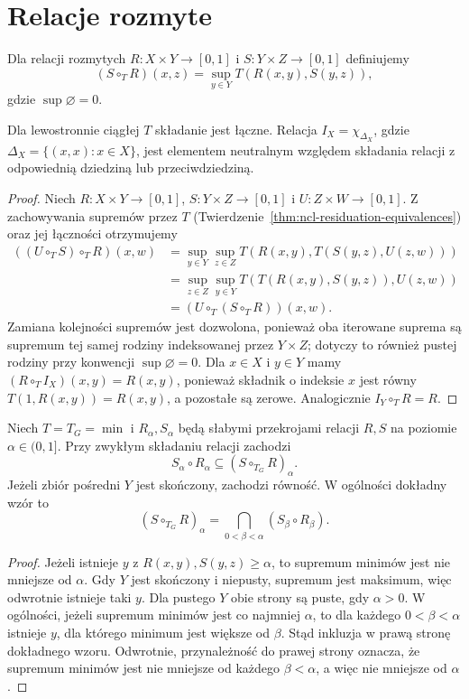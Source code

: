 \section{Relacje rozmyte}
Dla relacji rozmytych $R:X\times Y\to[0,1]$ i
$S:Y\times Z\to[0,1]$ definiujemy
\[
(S\circ_T R)(x,z)=\sup_{y\in Y}T(R(x,y),S(y,z)),
\]
gdzie $\sup\varnothing=0$.
\begin{stwierdzenie}
\label{prop:ncl-relation-associativity}
Dla lewostronnie ciągłej $T$ składanie jest łączne.
Relacja $I_X=\chi_{\Delta_X}$, gdzie
$\Delta_X=\{(x,x):x\in X\}$, jest elementem neutralnym
względem składania relacji z odpowiednią dziedziną
lub przeciwdziedziną.
\end{stwierdzenie}
\begin{proof}
Niech $R:X\times Y\to[0,1]$, $S:Y\times Z\to[0,1]$
i $U:Z\times W\to[0,1]$. Z zachowywania supremów
przez $T$ (Twierdzenie~\ref{thm:ncl-residuation-equivalences})
oraz jej łączności otrzymujemy
\begin{align*}
 ((U\circ_T S)\circ_T R)(x,w)
 &=\sup_{y\in Y}\sup_{z\in Z}
 T(R(x,y),T(S(y,z),U(z,w)))\\
 &=\sup_{z\in Z}\sup_{y\in Y}
 T(T(R(x,y),S(y,z)),U(z,w))\\
 &=(U\circ_T(S\circ_T R))(x,w).
\end{align*}
Zamiana kolejności supremów jest dozwolona, ponieważ
oba iterowane suprema są supremum tej samej rodziny
indeksowanej przez $Y\times Z$; dotyczy to również
pustej rodziny przy konwencji $\sup\varnothing=0$.
Dla $x\in X$ i $y\in Y$ mamy
$(R\circ_T I_X)(x,y)=R(x,y)$, ponieważ składnik
o indeksie $x$ jest równy $T(1,R(x,y))=R(x,y)$,
a pozostałe są zerowe. Analogicznie
$I_Y\circ_T R=R$.
\end{proof}

\begin{stwierdzenie}
\label{prop:ncl-relation-cut-composition}
Niech $T=T_G=\min$ i $R_\alpha,S_\alpha$ będą słabymi
przekrojami relacji $R,S$ na poziomie $\alpha\in(0,1]$.
Przy zwykłym składaniu relacji zachodzi
\[
 S_\alpha\circ R_\alpha\subseteq (S\circ_{T_G}R)_\alpha.
\]
Jeżeli zbiór pośredni $Y$ jest skończony, zachodzi
równość. W ogólności dokładny wzór to
\[
 (S\circ_{T_G}R)_\alpha
 =\bigcap_{0<\beta<\alpha}(S_\beta\circ R_\beta).
\]
\end{stwierdzenie}
\begin{proof}
Jeżeli istnieje $y$ z $R(x,y),S(y,z)\geq\alpha$,
to supremum minimów jest nie mniejsze od $\alpha$.
Gdy $Y$ jest skończony i niepusty, supremum jest
maksimum, więc odwrotnie istnieje taki $y$.
Dla pustego $Y$ obie strony są puste, gdy $\alpha>0$.
W ogólności, jeżeli supremum minimów jest co najmniej
$\alpha$, to dla każdego $0<\beta<\alpha$ istnieje $y$,
dla którego minimum jest większe od $\beta$.
Stąd inkluzja w prawą stronę dokładnego wzoru.
Odwrotnie, przynależność do prawej strony oznacza,
że supremum minimów jest nie mniejsze od każdego
$\beta<\alpha$, a więc nie mniejsze od $\alpha$.
\end{proof}

